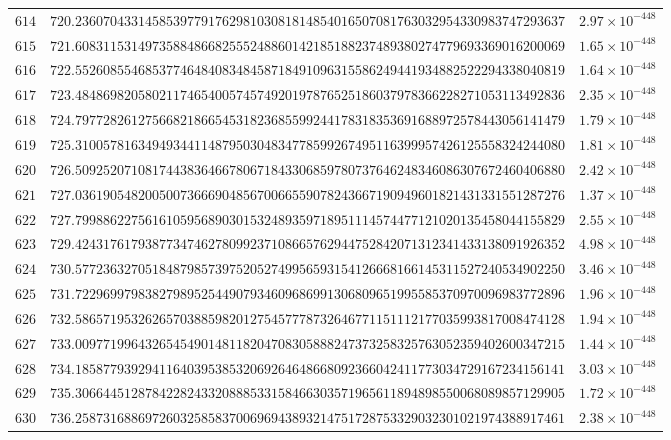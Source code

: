 \documentclass[12pt,reqno]{amsart}
\theoremstyle{remark}
\begin{document}
\begin{longtable}{clc}
$614$ & $720.2360704331458539779176298103081814854016507081763032954330983747293637$ & $2.97\times 10^{-448}$ \\
$615$ & $721.6083115314973588486682555248860142185188237489380274779693369016200069$ & $1.65\times 10^{-448}$ \\
$616$ & $722.5526085546853774648408348458718491096315586249441934882522294338040819$ & $1.64\times 10^{-448}$ \\
$617$ & $723.4848698205802117465400574574920197876525186037978366228271053113492836$ & $2.35\times 10^{-448}$ \\
$618$ & $724.7977282612756682186654531823685599244178318353691688972578443056141479$ & $1.79\times 10^{-448}$ \\
$619$ & $725.3100578163494934411487950304834778599267495116399957426125558324244080$ & $1.81\times 10^{-448}$ \\
$620$ & $726.5092520710817443836466780671843306859780737646248346086307672460406880$ & $2.42\times 10^{-448}$ \\
$621$ & $727.0361905482005007366690485670066559078243667190949601821431331551287276$ & $1.37\times 10^{-448}$ \\
$622$ & $727.7998862275616105956890301532489359718951114574477121020135458044155829$ & $2.55\times 10^{-448}$ \\
$623$ & $729.4243176179387734746278099237108665762944752842071312341433138091926352$ & $4.98\times 10^{-448}$ \\
$624$ & $730.5772363270518487985739752052749956593154126668166145311527240534902250$ & $3.46\times 10^{-448}$ \\
$625$ & $731.7229699798382798952544907934609686991306809651995585370970096983772896$ & $1.96\times 10^{-448}$ \\
$626$ & $732.5865719532626570388598201275457778732646771151112177035993817008474128$ & $1.94\times 10^{-448}$ \\
$627$ & $733.0097719964326545490148118204708305888247373258325763052359402600347215$ & $1.44\times 10^{-448}$ \\
$628$ & $734.1858779392941164039538532069264648668092366042411773034729167234156141$ & $3.03\times 10^{-448}$ \\
$629$ & $735.3066445128784228243320888533158466303571965611894898550068089857129905$ & $1.72\times 10^{-448}$ \\
$630$ & $736.2587316886972603258583700696943893214751728753329032301021974388917461$ & $2.38\times 10^{-448}$ \\

\end{longtable}
\end{document}
